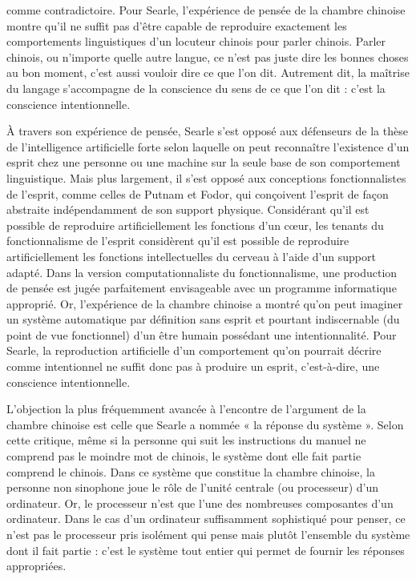 
comme contradictoire. Pour Searle, l’expérience de pensée de la chambre chinoise montre qu’il ne suffit pas d’être capable de reproduire exactement les comportements linguistiques d’un locuteur chinois pour parler chinois. Parler chinois, ou n’importe quelle autre langue, ce n’est pas juste dire les bonnes choses au bon moment, c’est aussi vouloir dire ce que l’on dit. Autrement dit, la maîtrise du langage s’accompagne de la conscience du sens de ce que l’on dit : c’est la conscience intentionnelle.\par


À travers son expérience de pensée, Searle s’est opposé aux défenseurs de la thèse de l'intelligence artificielle forte selon laquelle on peut reconnaître l’existence d’un esprit chez une personne ou une machine sur la seule base de son comportement linguistique. Mais plus largement, il s’est opposé aux conceptions fonctionnalistes de l’esprit, comme celles de Putnam et Fodor, qui conçoivent l’esprit de façon abstraite indépendamment de son support physique. Considérant qu’il est possible de reproduire artificiellement les fonctions d’un cœur, les tenants du fonctionnalisme de l'esprit considèrent qu’il est possible de reproduire artificiellement les fonctions intellectuelles du cerveau à l’aide d’un support adapté. Dans la version computationnaliste du fonctionnalisme, une production de pensée est jugée parfaitement envisageable avec un programme informatique approprié. Or, l'expérience de la chambre chinoise a montré qu’on peut imaginer un système automatique par définition sans esprit et pourtant indiscernable (du point de vue fonctionnel) d’un être humain possédant une intentionnalité. Pour Searle, la reproduction artificielle d’un comportement qu’on pourrait décrire comme intentionnel ne suffit donc pas à produire un esprit, c’est-à-dire, une conscience intentionnelle.\par


L’objection la plus fréquemment avancée à l’encontre de l’argument de la chambre chinoise est celle que Searle a nommée « la réponse du système ». Selon cette critique, même si la personne qui suit les instructions du manuel ne comprend pas le moindre mot de chinois, le système dont elle fait partie comprend le chinois. Dans ce système que constitue la chambre chinoise, la personne non sinophone joue le rôle de l’unité centrale (ou processeur) d’un ordinateur. Or, le processeur n’est que l’une des nombreuses composantes d’un ordinateur. Dans le cas d’un ordinateur suffisamment sophistiqué pour penser, ce n’est pas le processeur pris isolément qui pense mais plutôt l’ensemble du système dont il fait partie : c’est le système tout entier qui permet de fournir les réponses appropriées.\par

